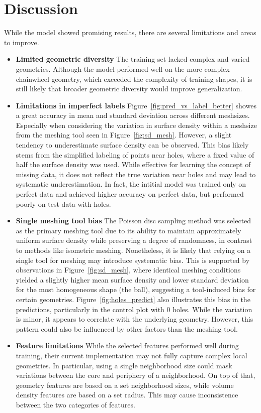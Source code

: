 \section{Discussion}
While the model showed promising results, there are several limitations and areas to improve.

\begin{itemize}
    \item \textbf{Limited geometric diversity}
    The training set lacked complex and varied geometries. Although the model performed well on the more complex chainwheel geometry, which exceeded the complexity of training shapes, it is still likely that broader geometric diversity would improve generalization.
    \item \textbf{Limitations in imperfect labels}
    Figure~\ref{fig:pred_vs_label_better} showes a great accuracy in mean and standard deviation across different meshsizes. Especially when considering the variation in surface density within a meshsize from the meshing tool seen in Figure~\ref{fig:sd_mesh}. However, a slight tendency to underestimate surface density can be observed. This bias likely stems from the simplified labeling of points near holes, where a fixed value of half the surface density was used. While effective for learning the concept of missing data, it does not reflect the true variation near holes and may lead to systematic underestimation. In fact, the intitial model was trained only on perfect data and achieved higher accuracy on perfect data, but performed poorly on test data with holes.
    \item \textbf{Single meshing tool bias}
    The Poisson disc sampling method was selected as the primary meshing tool due to its ability to maintain approximately uniform surface density while preserving a degree of randomness, in contrast to methods like isometric meshing. Nonetheless, it is likely that relying on a single tool for meshing may introduce systematic bias. This is supported by observations in Figure~\ref{fig:sd_mesh}, where identical meshing conditions yielded a slightly higher mean surface density and lower standard deviation for the most homogeneous shape (the ball), suggesting a tool-induced bias for certain geometries. Figure~\ref{fig:holes_predict} also illustrates this bias in the predictions, particularly in the control plot with 0 holes. While the variation is minor, it appears to correlate with the underlying geometry. However, this pattern could also be influenced by other factors than the meshing tool.
    \item \textbf{Feature limitations}
    While the selected features performed well during training, their current implementation may not fully capture complex local geometries. In particular, using a single neighborhood size could mask variations between the core and periphery of a neighborhood. On top of that, geometry features are based on a set neighborhood sizes, while volume density features are based on a set radius. This may cause inconsistence between the two categories of features.
\end{itemize}